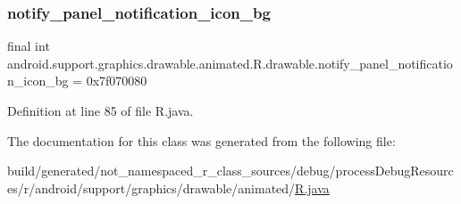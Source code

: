 \mbox{\label{classandroid_1_1support_1_1graphics_1_1drawable_1_1animated_1_1_r_1_1drawable_afd5a7eb941d015ffa1256e11549c45e1}} 
\subsubsection{\texorpdfstring{notify\_panel\_notification\_icon\_bg}{notify\_panel\_notification\_icon\_bg}}
{\footnotesize\ttfamily final int android.\+support.\+graphics.\+drawable.\+animated.\+R.\+drawable.\+notify\+\_\+panel\+\_\+notification\+\_\+icon\+\_\+bg = 0x7f070080\hspace{0.3cm}{\ttfamily [static]}}



Definition at line 85 of file R.\+java.



The documentation for this class was generated from the following file\+:\begin{DoxyCompactItemize}
\item 
build/generated/not\+\_\+namespaced\+\_\+r\+\_\+class\+\_\+sources/debug/process\+Debug\+Resources/r/android/support/graphics/drawable/animated/\mbox{\hyperlink{android_2support_2graphics_2drawable_2animated_2_r_8java}{R.\+java}}\end{DoxyCompactItemize}
